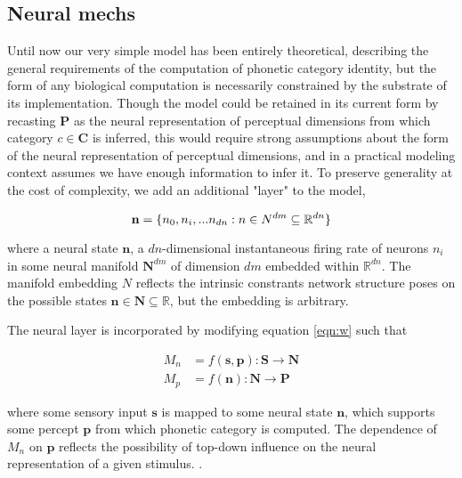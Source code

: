 
\subsection{Neural mechs}

Until now our very simple model has been entirely theoretical, describing the general requirements of the computation of phonetic category identity, but the form of any biological computation is necessarily constrained by the substrate of its implementation. Though the model could be retained in its current form by recasting $\mathbf{P}$ as the neural representation of perceptual dimensions from which category $c \in \mathbf{C}$ is inferred, this would require strong assumptions about the form of the neural representation of perceptual dimensions, and in a practical modeling context assumes we have enough information to infer it. To preserve generality at the cost of complexity, we add an additional "layer" to the model, 

\begin{equation}
\mathbf{n} = \{n_0, n_i, ... n_{dn} : n \in \mathbf \mathbf{N}^{dm} \subseteq \mathbb{R}^{dn}\}
\end{equation}

where a neural state $\mathbf{n}$, a $dn$-dimensional instantaneous firing rate of neurons $n_i$ in some neural manifold $\mathbf{N}^{dm}$ of dimension $dm$ embedded within $\mathbb{R}^{dn}$. The manifold embedding $N$ reflects the intrinsic constrants network structure poses on the possible states $\mathbf{n} \in \mathbf{N} \subseteq \mathbb{R}$, but the embedding is arbitrary.

The neural layer is incorporated by modifying equation \ref{eqn:w} such that

\begin{align}
M_n &= f(\mathbf{s}, \mathbf{p}) : \mathbf{S} \rightarrow \mathbf{N}\\
M_p &= f(\mathbf{n}) : \mathbf{N} \rightarrow \mathbf{P}
\end{align}

where some sensory input $\mathbf{s}$ is mapped to some neural state $\mathbf{n}$, which supports some percept $\mathbf{p}$ from which phonetic category is computed. The dependence of $M_n$ on $\mathbf{p}$ reflects the possibility of top-down influence on the neural representation of a given stimulus. . 




